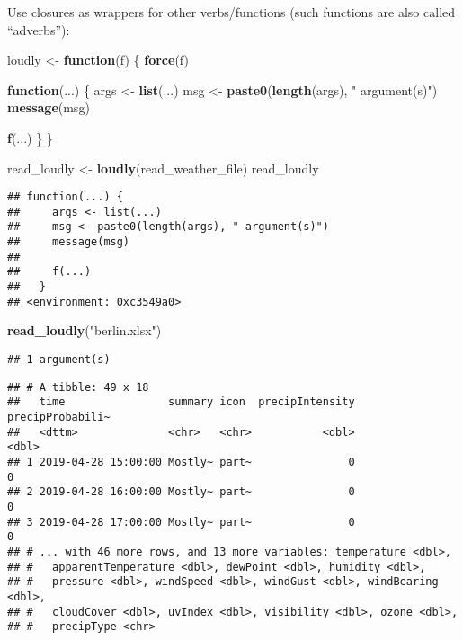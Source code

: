 \documentclass[]{book}
\newenvironment{Shaded}{\begin{snugshade}}{\end{snugshade}}
\newcommand{\ControlFlowTok}[1]{\textcolor[rgb]{0.13,0.29,0.53}{\textbf{#1}}}
\newcommand{\KeywordTok}[1]{\textcolor[rgb]{0.13,0.29,0.53}{\textbf{#1}}}
\newcommand{\NormalTok}[1]{#1}
\newcommand{\StringTok}[1]{\textcolor[rgb]{0.31,0.60,0.02}{#1}}
\begin{document}
Use closures as wrappers for other verbs/functions (such functions are also called ``adverbs''):

\begin{Shaded}
\begin{Highlighting}[]
\NormalTok{loudly <-}\StringTok{ }\ControlFlowTok{function}\NormalTok{(f) \{}
  \KeywordTok{force}\NormalTok{(f)}

  \ControlFlowTok{function}\NormalTok{(...) \{}
\NormalTok{    args <-}\StringTok{ }\KeywordTok{list}\NormalTok{(...)}
\NormalTok{    msg <-}\StringTok{ }\KeywordTok{paste0}\NormalTok{(}\KeywordTok{length}\NormalTok{(args), }\StringTok{" argument(s)"}\NormalTok{)}
    \KeywordTok{message}\NormalTok{(msg)}

    \KeywordTok{f}\NormalTok{(...)}
\NormalTok{  \}}
\NormalTok{\}}

\NormalTok{read_loudly <-}\StringTok{ }\KeywordTok{loudly}\NormalTok{(read_weather_file)}
\NormalTok{read_loudly}
\end{Highlighting}
\end{Shaded}

\begin{verbatim}
## function(...) {
##     args <- list(...)
##     msg <- paste0(length(args), " argument(s)")
##     message(msg)
## 
##     f(...)
##   }
## <environment: 0xc3549a0>
\end{verbatim}

\begin{Shaded}
\begin{Highlighting}[]
\KeywordTok{read_loudly}\NormalTok{(}\StringTok{"berlin.xlsx"}\NormalTok{)}
\end{Highlighting}
\end{Shaded}

\begin{verbatim}
## 1 argument(s)
\end{verbatim}

\begin{verbatim}
## # A tibble: 49 x 18
##   time                summary icon  precipIntensity precipProbabili~
##   <dttm>              <chr>   <chr>           <dbl>            <dbl>
## 1 2019-04-28 15:00:00 Mostly~ part~               0                0
## 2 2019-04-28 16:00:00 Mostly~ part~               0                0
## 3 2019-04-28 17:00:00 Mostly~ part~               0                0
## # ... with 46 more rows, and 13 more variables: temperature <dbl>,
## #   apparentTemperature <dbl>, dewPoint <dbl>, humidity <dbl>,
## #   pressure <dbl>, windSpeed <dbl>, windGust <dbl>, windBearing <dbl>,
## #   cloudCover <dbl>, uvIndex <dbl>, visibility <dbl>, ozone <dbl>,
## #   precipType <chr>
\end{verbatim}
\end{document}
